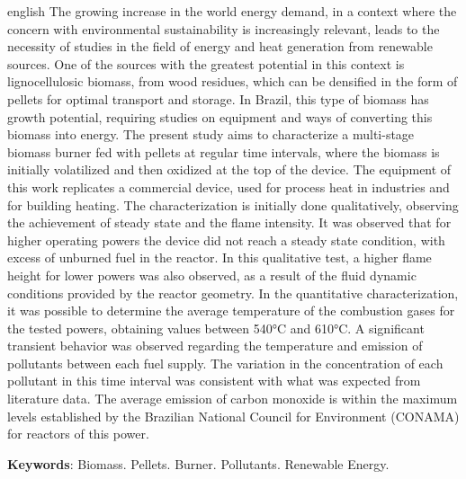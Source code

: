 
\begin{resumo}[Abstract]
 \begin{otherlanguage*}{english}
The growing increase in the world energy demand, in a context where the concern with environmental sustainability is increasingly relevant, leads to the necessity of studies in the field of energy and heat generation from renewable sources. One of the sources with the greatest potential in this context is lignocellulosic biomass, from wood residues, which can be densified in the form of pellets for optimal transport and storage. In Brazil, this type of biomass has growth potential, requiring studies on equipment and ways of converting this biomass into energy. The present study aims to characterize a multi-stage biomass burner fed with pellets at regular time intervals, where the biomass is initially volatilized and then oxidized at the top of the device. The equipment of this work replicates a commercial device, used for process heat in industries and for building heating. The characterization is initially done qualitatively, observing the achievement of steady state and the flame intensity. It was observed that for higher operating powers the device did not reach a steady state condition, with excess of unburned fuel in the reactor. In this qualitative test, a higher flame height for lower powers was also observed, as a result of the fluid dynamic conditions provided by the reactor geometry. In the quantitative characterization, it was possible to determine the average temperature of the combustion gases for the tested powers, obtaining values between 540°C and 610°C. A significant transient behavior was observed regarding the temperature and emission of pollutants between each fuel supply. The variation in the concentration of each pollutant in this time interval was consistent with what was expected from literature data. The average emission of carbon monoxide is within the maximum levels established by the Brazilian National Council for Environment (CONAMA) for reactors of this power.

   \textbf{Keywords}: Biomass. Pellets. Burner. Pollutants. Renewable Energy.
 \end{otherlanguage*}
\end{resumo}
